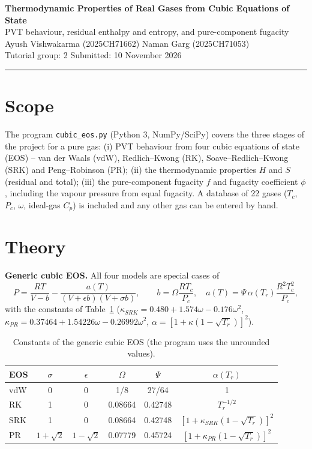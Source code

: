 \documentclass[10pt,a4paper]{article}
\begin{document}
\begin{center}
{\Large\bfseries Thermodynamic Properties of Real Gases from Cubic Equations of State}\\[2pt]
{\large PVT behaviour, residual enthalpy and entropy, and pure-component fugacity}\\[3pt]
Ayush Vishwakarma (2025CH71662) \quad Naman Garg (2025CH71053)\\[1pt]Tutorial group: 2 \quad Submitted: 10 November 2026
\end{center}
\vspace{-4pt}\hrule\vspace{3pt}

\section{Scope}
The program \texttt{cubic\_eos.py} (Python 3, NumPy/SciPy) covers the three stages of the project for a pure gas: (i) PVT behaviour from four cubic equations of state (EOS) -- van der Waals (vdW), Redlich--Kwong (RK), Soave--Redlich--Kwong (SRK) and Peng--Robinson (PR); (ii) the thermodynamic properties $H$ and $S$ (residual and total); (iii) the pure-component fugacity $f$ and fugacity coefficient $\phi$, including the vapour pressure from equal fugacity. A database of 22 gases ($T_c$, $P_c$, $\omega$, ideal-gas $C_p$) is included and any other gas can be entered by hand.

\section{Theory}
\textbf{Generic cubic EOS.} All four models are special cases of
\begin{equation}
P=\frac{RT}{V-b}-\frac{a(T)}{(V+\epsilon b)(V+\sigma b)},\qquad b=\Omega\frac{RT_c}{P_c},\quad a(T)=\Psi\,\alpha(T_r)\frac{R^2T_c^2}{P_c},
\end{equation}
with the constants of Table~\ref{tab:eos} ($\kappa_{SRK}=0.480+1.574\omega-0.176\omega^2$, $\kappa_{PR}=0.37464+1.54226\omega-0.26992\omega^2$, $\alpha=[1+\kappa(1-\sqrt{T_r})]^2$).
\begin{table}[h]\centering\small
\begin{tabular}{lccccc}\toprule
EOS & $\sigma$ & $\epsilon$ & $\Omega$ & $\Psi$ & $\alpha(T_r)$ \\\midrule
vdW & 0 & 0 & 1/8 & 27/64 & 1\\
RK & 1 & 0 & 0.08664 & 0.42748 & $T_r^{-1/2}$\\
SRK & 1 & 0 & 0.08664 & 0.42748 & $[1+\kappa_{SRK}(1-\sqrt{T_r})]^2$\\
PR & $1+\sqrt2$ & $1-\sqrt2$ & 0.07779 & 0.45724 & $[1+\kappa_{PR}(1-\sqrt{T_r})]^2$\\\bottomrule
\end{tabular}\caption{Constants of the generic cubic EOS (the program uses the unrounded values).}\label{tab:eos}
\end{table}
\end{document}

